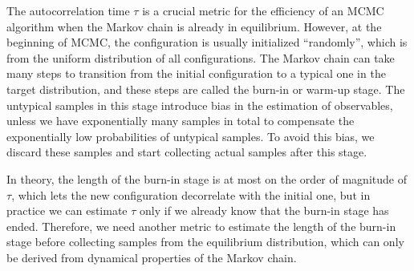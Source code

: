 The autocorrelation time $\tau$ is a crucial metric for the efficiency of an MCMC algorithm when the Markov chain is already in equilibrium. However, at the beginning of MCMC, the configuration is usually initialized ``randomly'', which is from the uniform distribution of all configurations. The Markov chain can take many steps to transition from the initial configuration to a typical one in the target distribution, and these steps are called the burn-in or warm-up stage. The untypical samples in this stage introduce bias in the estimation of observables, unless we have exponentially many samples in total to compensate the exponentially low probabilities of untypical samples. To avoid this bias, we discard these samples and start collecting actual samples after this stage.

In theory, the length of the burn-in stage is at most on the order of magnitude of $\tau$, which lets the new configuration decorrelate with the initial one, but in practice we can estimate $\tau$ only if we already know that the burn-in stage has ended. Therefore, we need another metric to estimate the length of the burn-in stage before collecting samples from the equilibrium distribution, which can only be derived from dynamical properties of the Markov chain.

